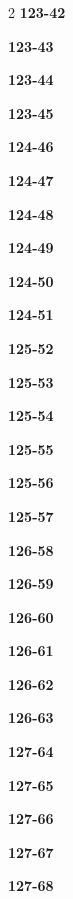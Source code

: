 \documentclass[10pt,a4paper]{article}
\begin{document}
\begin{multicols}{2}
\noindent\textbf{123-42}\ \par
\noindent\textbf{123-43}\ \par
\noindent\textbf{123-44}\ \par
\noindent\textbf{123-45}\ \par
\noindent\textbf{124-46}\ \par
\noindent\textbf{124-47}\ \par
\noindent\textbf{124-48}\ \par
\noindent\textbf{124-49}\ \par
\noindent\textbf{124-50}\ \par
\noindent\textbf{124-51}\ \par
\noindent\textbf{125-52}\ \par
\noindent\textbf{125-53}\ \par
\noindent\textbf{125-54}\ \par
\noindent\textbf{125-55}\ \par
\noindent\textbf{125-56}\ \par
\noindent\textbf{125-57}\ \par
\noindent\textbf{126-58}\ \par
\noindent\textbf{126-59}\ \par
\noindent\textbf{126-60}\ \par
\noindent\textbf{126-61}\ \par
\noindent\textbf{126-62}\ \par
\noindent\textbf{126-63}\ \par
\noindent\textbf{127-64}\ \par
\noindent\textbf{127-65}\ \par
\noindent\textbf{127-66}\ \par
\noindent\textbf{127-67}\ \par
\noindent\textbf{127-68}\ \par
\end{multicols}
\end{document}
